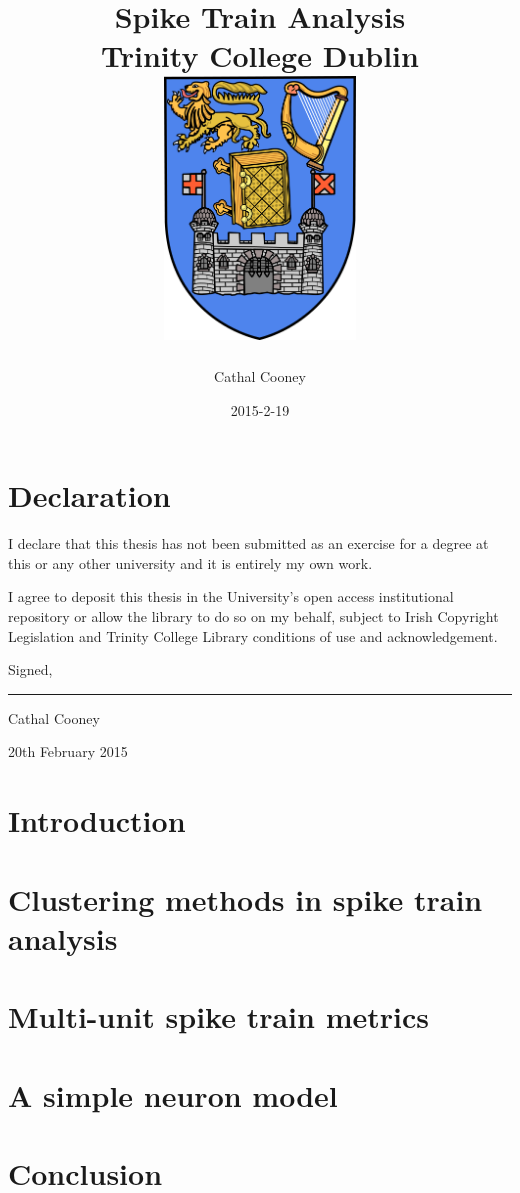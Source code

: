 \documentclass[12pt]{report}
\title{
	{Spike Train Analysis} \\
	{\large Trinity College Dublin} \bigskip\\
	{\includegraphics[width=2in]{tcd.png}}
}
\author{Cathal Cooney}
\date{2015-2-19}
\begin{document}
\maketitle

%
%
\chapter*{Declaration}
I declare that this thesis has not been submitted as an exercise for a degree at this or any other university and it is entirely my own work.

\bigskip
I agree to deposit this thesis in the University's open access institutional repository or allow the library to do so on my behalf, subject to Irish Copyright Legislation and Trinity College Library conditions of use and acknowledgement.

\bigskip

\bigskip

\bigskip

Signed,

\bigskip

\bigskip

\rule{20em}{0.5pt}

Cathal Cooney

20th February 2015

%

\tableofcontents


\chapter{Introduction}


\chapter{Clustering methods in spike train analysis}


\chapter{Multi-unit spike train metrics}


\chapter{A simple neuron model}


\chapter{Conclusion}



\end{document}
